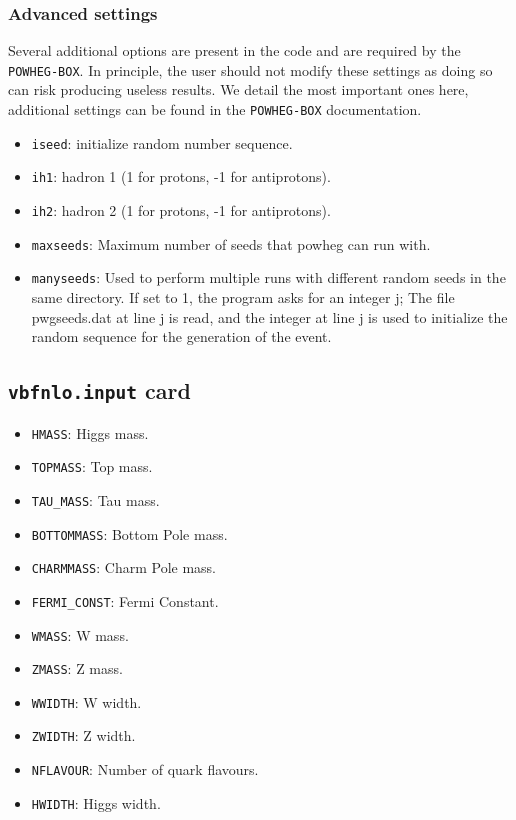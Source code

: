 \documentclass[12pt,a4]{article}
\begin{document}
\subsubsection{Advanced settings}
Several additional options are present in the code and are required by
the \texttt{POWHEG-BOX}.
%
In principle, the user should not modify these settings as doing so
can risk producing useless results.
%
We detail the most important ones here, additional settings can be
found in the \texttt{POWHEG-BOX} documentation.
\begin{itemize}  
\item\texttt{iseed}: initialize random number sequence.
  
\item\texttt{ih1}: hadron 1 (1 for protons, -1 for antiprotons).
  
\item\texttt{ih2}: hadron 2 (1 for protons, -1 for antiprotons).

\item\texttt{maxseeds}: Maximum number of seeds that powheg can run
  with.

\item\texttt{manyseeds}: Used to perform multiple runs with different
  random seeds in the same directory.  If set to 1, the program asks
  for an integer j; The file pwgseeds.dat at line j is read, and the
  integer at line j is used to initialize the random sequence for the
  generation of the event.
                 
\end{itemize}

\subsection{\texttt{vbfnlo.input} card}
\begin{itemize}
\item\texttt{HMASS}: Higgs mass.
  
\item\texttt{TOPMASS}: Top mass.
  
\item\texttt{TAU\_MASS}: Tau mass.
  
\item\texttt{BOTTOMMASS}: Bottom Pole mass.
  
\item\texttt{CHARMMASS}: Charm Pole mass.
  
\item\texttt{FERMI\_CONST}: Fermi Constant.
  
\item\texttt{WMASS}: W mass.
  
\item\texttt{ZMASS}: Z mass.
  
\item\texttt{WWIDTH}: W width.
  
\item\texttt{ZWIDTH}: Z width.
  
\item\texttt{NFLAVOUR}: Number of quark flavours.
  
\item\texttt{HWIDTH}: Higgs width.

\end{itemize}
\end{document}
